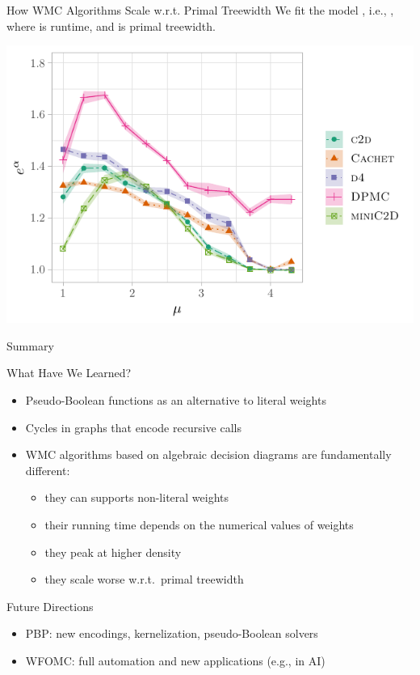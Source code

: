 \documentclass{beamer}
\begin{document}
 \begin{frame}{How WMC Algorithms Scale w.r.t. Primal Treewidth}
  We fit the model , i.e.,
  , where  is
  \alert{runtime}, and  is \alert{primal treewidth}.

  \centering
  \includegraphics{linearbase.pdf}
\end{frame}

\begin{frame}{Summary}
  \begin{block}{What Have We Learned?}
    \begin{itemize}
      \item Pseudo-Boolean functions as an alternative to literal weights
      \item Cycles in graphs that encode recursive calls
      \item WMC algorithms based on algebraic decision diagrams are fundamentally different:
      \begin{itemize}
        \item they can supports non-literal weights
        \item their running time depends on the numerical values of weights
        \item they peak at higher density
        \item they scale worse w.r.t.\ primal treewidth
      \end{itemize}
    \end{itemize}
  \end{block}
  \begin{block}{Future Directions}
    \begin{itemize}
      \item PBP\@: new encodings, kernelization, pseudo-Boolean solvers
      \item WFOMC\@: full automation and new applications (e.g., in AI)
    \end{itemize}
  \end{block}
\end{frame}
\end{document}
